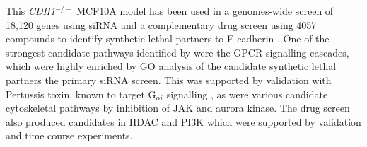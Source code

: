 This \textit{CDH1}$^{-/-}$  MCF10A model has been used in a \glspl{genome}-wide screen of 18,120 genes using \gls{siRNA} and a complementary drug screen using 4057 compounds to identify \gls{synthetic lethal} partners to \gls{E-cadherin} \citep{Telford2015}. One of the strongest candidate pathways identified by \citet{Telford2015} were the \gls{GPCR} signalling cascades, which were highly enriched by \gls{GO} analysis of the candidate \gls{synthetic lethal} partners the primary \gls{siRNA} screen. This was supported by validation with Pertussis toxin, known to target  G$_{\alpha i}$ signalling \citep{Clark2004}, as were various candidate cytoskeletal pathways by inhibition of \gls{JAK} and aurora kinase. The drug screen also produced candidates in \gls{HDAC} and \gls{PI3K} which were supported by validation and time course experiments.



